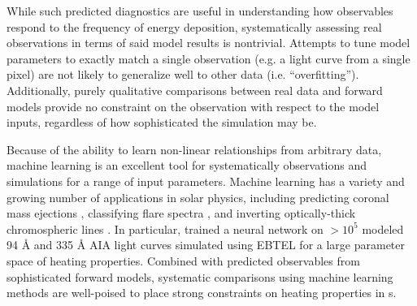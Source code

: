 While such predicted diagnostics are useful in understanding how observables respond to the frequency of energy deposition, systematically assessing real observations in terms of said model results is nontrivial.
Attempts to tune model parameters to exactly match a single observation (e.g. a light curve from a single pixel) are not likely to generalize well to other data (i.e. ``overfitting'').
Additionally, purely qualitative comparisons between real data and forward models provide no constraint on the observation with respect to the model inputs, regardless of how sophisticated the simulation may be.

Because of the ability to learn non-linear relationships from arbitrary data, machine learning  is an excellent tool for systematically  observations and simulations for a range of input parameters.
Machine learning has a variety and growing number of applications in solar physics, including predicting coronal mass ejections \citep[e.g.][]{bobra_predicting_2016}, classifying flare spectra \citep{panos_identifying_2018}, and inverting optically-thick chromospheric lines \citep{osborne_radynversion_2019}.
In particular, \citet{tajfirouze_time-resolved_2016} trained a neural network  on $>10^5$ modeled 94 \AA{} and 335 \AA{} AIA light curves simulated using EBTEL for a large parameter space of heating properties.
Combined with predicted observables from sophisticated forward models, systematic comparisons using machine learning methods are well-poised to place strong constraints on heating properties in \AR s.

